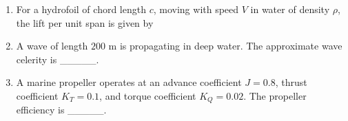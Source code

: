 \documentclass[journal,12pt,onecolumn]{IEEEtran}
\theoremstyle{remark}
\begin{document}
\begin{enumerate}
\begin{enumerate}[label=\Alph*.]
\end{enumerate}

\item For a hydrofoil of chord length $c$, moving with speed $V$ in water of density $\rho$, the lift per unit span is given by\hfill{}

\begin{enumerate}[label=\Alph*.]
\end{enumerate}

\item A wave of length $200$ m is propagating in deep water.  
The approximate wave celerity is \_\_\_\_\_.\hfill{}

\begin{enumerate}[label=\Alph*.]
\end{enumerate}

\item A marine propeller operates at an advance coefficient $J = 0.8$, thrust coefficient $K_T = 0.1$, and torque coefficient $K_Q = 0.02$.  
The propeller efficiency is \_\_\_\_\_.\hfill{}

\begin{enumerate}[label=\Alph*.]
\end{enumerate}


\end{enumerate}
\end{document}
